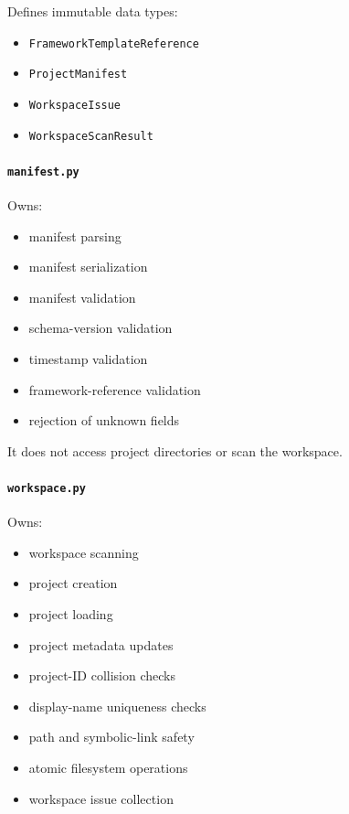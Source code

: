 Defines immutable data types:

\begin{itemize}
\tightlist
\item
  \texttt{FrameworkTemplateReference}
\item
  \texttt{ProjectManifest}
\item
  \texttt{WorkspaceIssue}
\item
  \texttt{WorkspaceScanResult}
\end{itemize}

\hypertarget{manifestpy}{%
\paragraph{\texorpdfstring{\texttt{manifest.py}}{manifest.py}}\label{manifestpy}}

Owns:

\begin{itemize}
\tightlist
\item
  manifest parsing
\item
  manifest serialization
\item
  manifest validation
\item
  schema-version validation
\item
  timestamp validation
\item
  framework-reference validation
\item
  rejection of unknown fields
\end{itemize}

It does not access project directories or scan the workspace.

\hypertarget{workspacepy}{%
\paragraph{\texorpdfstring{\texttt{workspace.py}}{workspace.py}}\label{workspacepy}}

Owns:

\begin{itemize}
\tightlist
\item
  workspace scanning
\item
  project creation
\item
  project loading
\item
  project metadata updates
\item
  project-ID collision checks
\item
  display-name uniqueness checks
\item
  path and symbolic-link safety
\item
  atomic filesystem operations
\item
  workspace issue collection
\end{itemize}

